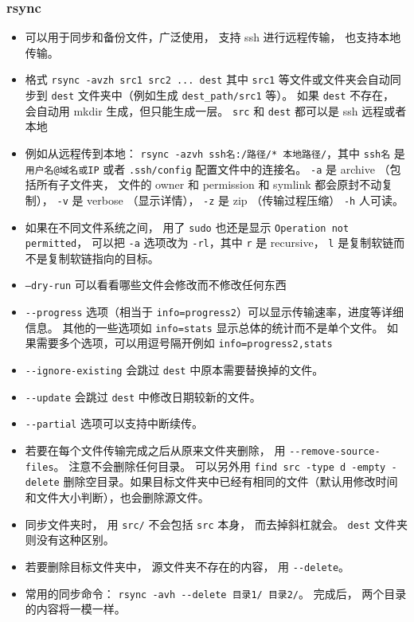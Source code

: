 \subsubsection{rsync}
\begin{itemize}
\item 可以用于同步和备份文件，广泛使用， 支持 ssh 进行远程传输， 也支持本地传输。
\item 格式 \verb`rsync -avzh src1 src2 ... dest` 其中 \verb`src1` 等文件或文件夹会自动同步到 \verb`dest` 文件夹中（例如生成 \verb`dest_path/src1` 等）。 如果 \verb`dest` 不存在， 会自动用 mkdir 生成，但只能生成一层。 \verb`src` 和 \verb`dest` 都可以是 ssh 远程或者本地
\item 例如从远程传到本地： \verb`rsync -azvh ssh名:/路径/* 本地路径/`，其中 \verb`ssh名` 是 \verb`用户名@域名或IP` 或者 \verb`.ssh/config` 配置文件中的连接名。 \verb`-a` 是 archive （包括所有子文件夹， 文件的 owner 和 permission 和 symlink 都会原封不动复制）， \verb`-v` 是 verbose （显示详情）， \verb`-z` 是 zip （传输过程压缩） \verb`-h` 人可读。
\item 如果在不同文件系统之间， 用了 \verb`sudo` 也还是显示 \verb`Operation not permitted`， 可以把 \verb`-a` 选项改为 \verb`-rl`，其中 \verb`r` 是 recursive， \verb`l` 是复制软链而不是复制软链指向的目标。
\item \verb`–dry-run` 可以看看哪些文件会修改而不修改任何东西
\item \verb`--progress` 选项（相当于 \verb`info=progress2`）可以显示传输速率，进度等详细信息。 其他的一些选项如 \verb`info=stats` 显示总体的统计而不是单个文件。 如果需要多个选项，可以用逗号隔开例如 \verb`info=progress2,stats`
\item \verb`--ignore-existing` 会跳过 \verb`dest` 中原本需要替换掉的文件。
\item \verb`--update` 会跳过 \verb`dest` 中修改日期较新的文件。
\item \verb`--partial` 选项可以支持中断续传。
\item 若要在每个文件传输完成之后从原来文件夹删除， 用 \verb`--remove-source-files`。 注意不会删除任何目录。 可以另外用 \verb`find src -type d -empty -delete` 删除空目录。如果目标文件夹中已经有相同的文件（默认用修改时间和文件大小判断），也会删除源文件。
\item 同步文件夹时， 用 \verb`src/` 不会包括 \verb`src` 本身， 而去掉斜杠就会。 \verb`dest` 文件夹则没有这种区别。
\item 若要删除目标文件夹中， 源文件夹不存在的内容， 用 \verb`--delete`。
\item 常用的同步命令： \verb`rsync -avh --delete 目录1/ 目录2/`。 完成后， 两个目录的内容将一模一样。

\end{itemize}
